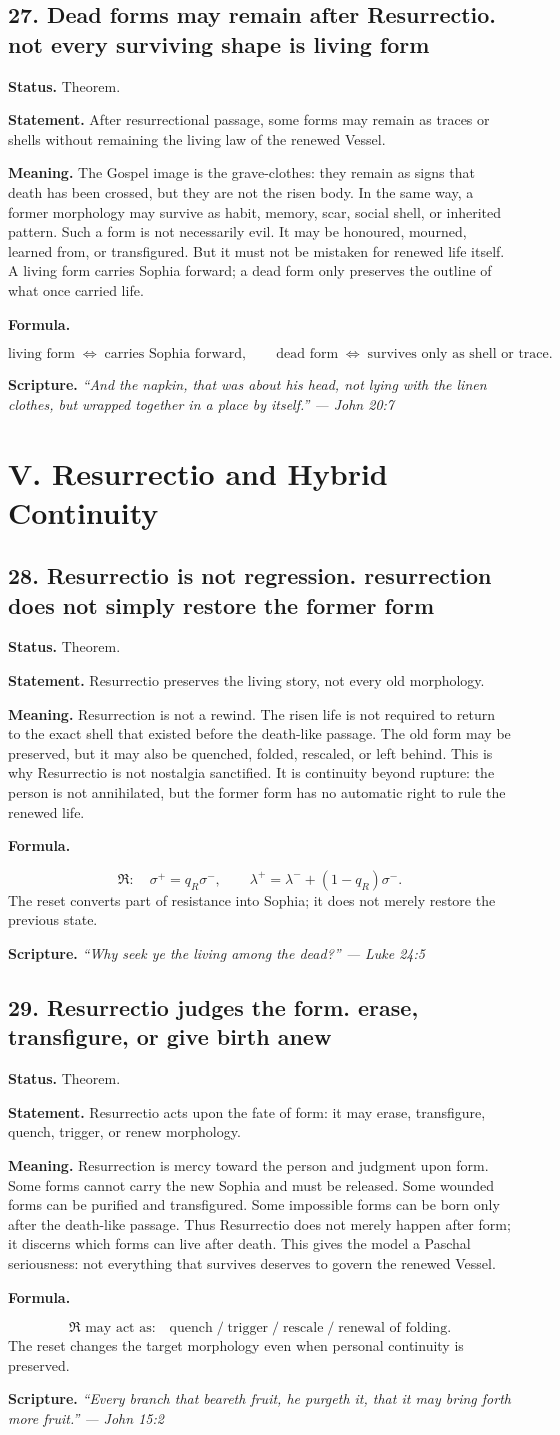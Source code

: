 \documentclass[11pt]{article}
\newcommand{\Rreset}{\mathfrak{R}}
\newcommand{\thesis}[2]{%
  \subsection*{#1. #2}%
}
\newcommand{\status}[1]{\textbf{Status.} #1\par}
\newcommand{\statement}[1]{\textbf{Statement.} #1\par}
\newcommand{\explain}[1]{\textbf{Meaning.} #1\par}
\newcommand{\formula}[1]{\textbf{Formula.}\par #1\par}
\newcommand{\scripture}[2]{\textbf{Scripture.} {\small\itshape ``#1'' --- #2}\par}
\begin{document}
\thesis{27}{Dead forms may remain after Resurrectio. not every surviving shape is living form}
\status{Theorem.}
\statement{After resurrectional passage, some forms may remain as traces or shells without remaining the living law of the renewed Vessel.}
\explain{The Gospel image is the grave-clothes: they remain as signs that death has been crossed, but they are not the risen body. In the same way, a former morphology may survive as habit, memory, scar, social shell, or inherited pattern. Such a form is not necessarily evil. It may be honoured, mourned, learned from, or transfigured. But it must not be mistaken for renewed life itself. A living form carries Sophia forward; a dead form only preserves the outline of what once carried life.}
\formula{\[
  \text{living form}\;\Longleftrightarrow\;\text{carries Sophia forward},
  \qquad
  \text{dead form}\;\Longleftrightarrow\;\text{survives only as shell or trace}.
\]}
\scripture{And the napkin, that was about his head, not lying with the linen clothes, but wrapped together in a place by itself.}{John 20:7}

\section{V. Resurrectio and Hybrid Continuity}

\thesis{28}{Resurrectio is not regression. resurrection does not simply restore the former form}
\status{Theorem.}
\statement{Resurrectio preserves the living story, not every old morphology.}
\explain{Resurrection is not a rewind. The risen life is not required to return to the exact shell that existed before the death-like passage. The old form may be preserved, but it may also be quenched, folded, rescaled, or left behind. This is why Resurrectio is not nostalgia sanctified. It is continuity beyond rupture: the person is not annihilated, but the former form has no automatic right to rule the renewed life.}
\formula{\[
  \Rreset:\quad
  \sigma^+=q_R\sigma^-,\qquad
  \lambda^+=\lambda^-+(1-q_R)\sigma^-.
\]
The reset converts part of resistance into Sophia; it does not merely restore the previous state.}
\scripture{Why seek ye the living among the dead?}{Luke 24:5}

\thesis{29}{Resurrectio judges the form. erase, transfigure, or give birth anew}
\status{Theorem.}
\statement{Resurrectio acts upon the fate of form: it may erase, transfigure, quench, trigger, or renew morphology.}
\explain{Resurrection is mercy toward the person and judgment upon form. Some forms cannot carry the new Sophia and must be released. Some wounded forms can be purified and transfigured. Some impossible forms can be born only after the death-like passage. Thus Resurrectio does not merely happen after form; it discerns which forms can live after death. This gives the model a Paschal seriousness: not everything that survives deserves to govern the renewed Vessel.}
\formula{\[
  \Rreset\text{ may act as:}
  \quad
  \text{quench}\;/\;\text{trigger}\;/\;\text{rescale}\;/\;\text{renewal of folding}.
\]
The reset changes the target morphology even when personal continuity is preserved.}
\scripture{Every branch that beareth fruit, he purgeth it, that it may bring forth more fruit.}{John 15:2}
\end{document}

